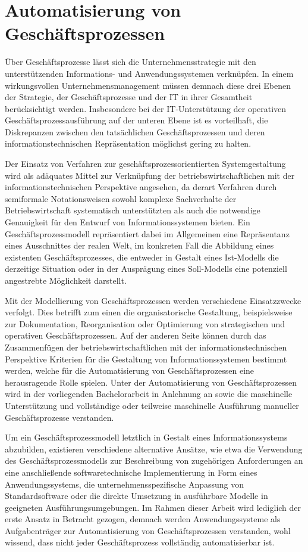 \section{Automatisierung von Geschäftsprozessen}\label{sec:Automatisierung}
Über Geschäftsprozesse lässt sich die Unternehmensstrategie mit den unterstützenden Informations- und Anwendungssystemen verknüpfen.
In einem wirkungsvollen Unternehmensmanagement müssen demnach diese drei Ebenen der Strategie, der Geschäftsprozesse und der \ac{IT} in ihrer Gesamtheit berücksichtigt werden.
Insbesondere bei der \ac{IT}-Unterstützung der operativen Geschäftsprozessausführung auf der unteren Ebene ist es vorteilhaft, die Diskrepanzen zwischen den tatsächlichen Geschäftsprozessen und deren informationstechnischen Repräsentation möglichst gering zu halten.

Der Einsatz von Verfahren zur geschäftsprozessorientierten Systemgestaltung wird als adäquates Mittel zur Verknüpfung der betriebswirtschaftlichen mit der informationstechnischen Perspektive angesehen, da derart Verfahren durch semiformale Notationsweisen sowohl komplexe Sachverhalte der Betriebswirtschaft systematisch unterstützten als auch die notwendige Genauigkeit für den Entwurf von Informationssystemen bieten.
Ein Geschäftsprozessmodell repräsentiert dabei im Allgemeinen eine Repräsentanz eines Ausschnittes der realen Welt, im konkreten Fall die Abbildung eines existenten Geschäftsprozesses, die entweder in Gestalt eines Ist-Modells die derzeitige Situation oder in der Ausprägung eines Soll-Modells eine potenziell angestrebte Möglichkeit darstellt.

Mit der Modellierung von Geschäftsprozessen werden verschiedene Einsatzzwecke verfolgt.
Dies betrifft zum einen die organisatorische Gestaltung, beispielsweise zur Dokumentation, Reorganisation oder Optimierung von strategischen und operativen Geschäftsprozessen. 
Auf der anderen Seite können durch das Zusammenfügen der betriebswirtschaftlichen mit der informationstechnischen Perspektive Kriterien für die Gestaltung von Informationssystemen bestimmt werden, welche für die Automatisierung von Geschäftsprozessen eine herausragende Rolle spielen.
Unter der Automatisierung von Geschäftsprozessen wird in der vorliegenden Bachelorarbeit in Anlehnung an \citeauthor{Abolhassan.2016} \cite{Abolhassan.2016} sowie \citeauthor{Jobst.2010} \cite{Jobst.2010} die maschinelle Unterstützung und vollständige oder teilweise maschinelle Ausführung manueller Geschäftsprozesse verstanden.

Um ein Geschäftsprozessmodell letztlich in Gestalt eines Informationssystems abzubilden, existieren verschiedene alternative Ansätze, wie etwa die Verwendung des Geschäftsprozessmodells zur Beschreibung von zugehörigen Anforderungen an eine anschließende softwaretechnische Implementierung in Form eines Anwendungssystems, die unternehmensspezifische Anpassung von Standardsoftware oder die direkte Umsetzung in ausführbare Modelle in geeigneten Ausführungsumgebungen.
\cite{Lehmann.2008} Im Rahmen dieser Arbeit wird lediglich der erste Ansatz in Betracht gezogen, demnach werden Anwendungssysteme als Aufgabenträger zur Automatisierung von Geschäftsprozessen verstanden, wohl wissend, dass nicht jeder Geschäftsprozess vollständig automatisierbar ist.

